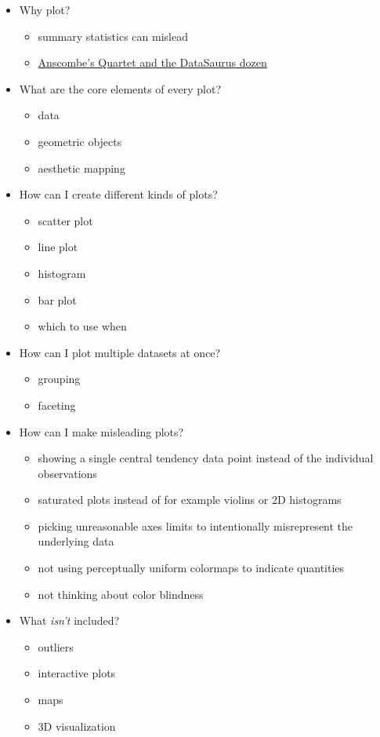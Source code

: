 \documentclass[]{Nemilov}
\providecommand{\tightlist}{%
  \setlength{\itemsep}{0pt}\setlength{\parskip}{0pt}}
\begin{document}
\begin{itemize}
\tightlist
\item
  Why plot?

  \begin{itemize}
  \tightlist
  \item
    summary statistics can mislead
  \item
    \href{https://blog.revolutionanalytics.com/2017/05/the-datasaurus-dozen.html}{Anscombe's Quartet and the DataSaurus dozen}
  \end{itemize}
\item
  What are the core elements of every plot?

  \begin{itemize}
  \tightlist
  \item
    data
  \item
    geometric objects
  \item
    aesthetic mapping
  \end{itemize}
\item
  How can I create different kinds of plots?

  \begin{itemize}
  \tightlist
  \item
    scatter plot
  \item
    line plot
  \item
    histogram
  \item
    bar plot
  \item
    which to use when
  \end{itemize}
\item
  How can I plot multiple datasets at once?

  \begin{itemize}
  \tightlist
  \item
    grouping
  \item
    faceting
  \end{itemize}
\item
  How can I make misleading plots?

  \begin{itemize}
  \tightlist
  \item
    showing a single central tendency data point instead of the individual observations
  \item
    saturated plots instead of for example violins or 2D histograms
  \item
    picking unreasonable axes limits to intentionally misrepresent the underlying data
  \item
    not using perceptually uniform colormaps to indicate quantities
  \item
    not thinking about color blindness
  \end{itemize}
\item
  What \emph{isn't} included?

  \begin{itemize}
  \tightlist
  \item
    outliers
  \item
    interactive plots
  \item
    maps
  \item
    3D visualization
  \end{itemize}
\end{itemize}
\end{document}
